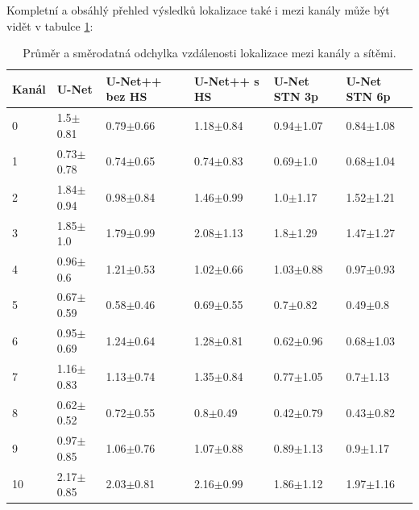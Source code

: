 Kompletní a obsáhlý přehled výsledků lokalizace také i mezi kanály může být vidět v tabulce \ref{tab:mean_std_channels}:

\begin{table}[ht]
    \centering
    \begin{tabular}{llllll}
    \toprule
    Kanál & U-Net & U-Net++ bez HS & U-Net++ s HS & U-Net STN 3p & U-Net STN 6p \\
    \midrule
    0 & 1.5$\pm$0.81 & 0.79$\pm$0.66 & 1.18$\pm$0.84 & 0.94$\pm$1.07 & 0.84$\pm$1.08 \\
    1 & 0.73$\pm$0.78 & 0.74$\pm$0.65 & 0.74$\pm$0.83 & 0.69$\pm$1.0 & 0.68$\pm$1.04 \\
    2 & 1.84$\pm$0.94 & 0.98$\pm$0.84 & 1.46$\pm$0.99 & 1.0$\pm$1.17 & 1.52$\pm$1.21 \\
    3 & 1.85$\pm$1.0 & 1.79$\pm$0.99 & 2.08$\pm$1.13 & 1.8$\pm$1.29 & 1.47$\pm$1.27 \\
    4 & 0.96$\pm$0.6 & 1.21$\pm$0.53 & 1.02$\pm$0.66 & 1.03$\pm$0.88 & 0.97$\pm$0.93 \\
    5 & 0.67$\pm$0.59 & 0.58$\pm$0.46 & 0.69$\pm$0.55 & 0.7$\pm$0.82 & 0.49$\pm$0.8 \\
    6 & 0.95$\pm$0.69 & 1.24$\pm$0.64 & 1.28$\pm$0.81 & 0.62$\pm$0.96 & 0.68$\pm$1.03 \\
    7 & 1.16$\pm$0.83 & 1.13$\pm$0.74 & 1.35$\pm$0.84 & 0.77$\pm$1.05 & 0.7$\pm$1.13 \\
    8 & 0.62$\pm$0.52 & 0.72$\pm$0.55 & 0.8$\pm$0.49 & 0.42$\pm$0.79 & 0.43$\pm$0.82 \\
    9 & 0.97$\pm$0.85 & 1.06$\pm$0.76 & 1.07$\pm$0.88 & 0.89$\pm$1.13 & 0.9$\pm$1.17 \\
    10 & 2.17$\pm$0.85 & 2.03$\pm$0.81 & 2.16$\pm$0.99 & 1.86$\pm$1.12 & 1.97$\pm$1.16 \\
    \bottomrule
    \end{tabular}
    \caption[Průměr a směrodatná odchylka vzdálenosti mezi kanály a sítěmi]{Průměr a směrodatná odchylka vzdálenosti lokalizace mezi kanály a sítěmi.}
    \label{tab:mean_std_channels}
\end{table}


\endinput